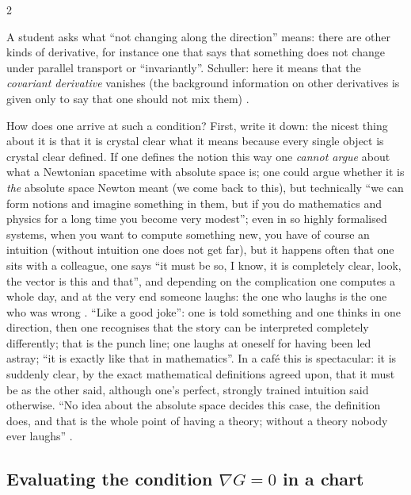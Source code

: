\begin{paracol}{2}
\begin{coursenote}
A student asks what ``not changing along the direction'' means: there are other kinds of derivative, for instance one that says that something does not change under parallel transport or ``invariantly''. Schuller: here it means that the \emph{covariant derivative} vanishes
(the background information on other derivatives is given only to say that one should not mix them) .
\end{coursenote}

\begin{aside}
How does one arrive at such a condition? First, write it down: the nicest thing about it is that it is crystal clear what it means because every single object is crystal clear defined. If one defines the notion this way one \emph{cannot argue} about what a Newtonian spacetime with absolute space is;
one could argue whether it is \emph{the} absolute space Newton meant (we come back to this), but technically ``we can form notions and imagine something in them, but if you do mathematics and physics for a long time you become very modest''; even in so highly formalised systems, when you want to compute something new, you have of course an intuition (without intuition one does not get far),
but it happens often that one sits with a colleague, one says ``it must be so, I know, it is completely clear, look, the vector is this and that'', and depending on the complication one computes a whole day, and at the very end someone laughs: the one who laughs is the one who was wrong
. ``Like a good joke'': one is told something and one thinks in one direction, then one recognises that the story can be interpreted completely differently; that is the punch line; one laughs at oneself for having been led astray; ``it is exactly like that in mathematics''. In a caf\'e this is
spectacular: it is suddenly clear, by the exact mathematical definitions agreed upon, that it must be as the other said, although one's perfect, strongly trained intuition said otherwise. ``No idea about the absolute space decides this case, the definition does, and that is the whole point of having a theory;
without a theory nobody ever laughs'' .
\end{aside}

\subsection{Evaluating the condition $\nabla G=0$ in a chart}\label{ssec:as-eval}


\end{paracol}
